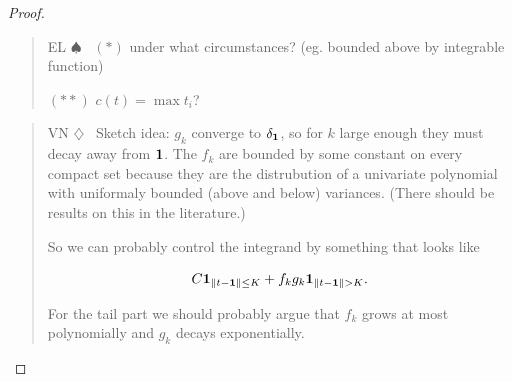 \documentclass[12pt]{article}
\newenvironment{vn}{\begin{quote}\color{myviolet} \small\sf VN $\diamondsuit$~}{\end{quote}}
\newenvironment{el}{\begin{quote}\color{amethyst} \small\sf EL $\spadesuit$~}{\end{quote}}
\begin{document}
\begin{proof}
\begin{el}
        $(*)$ under what circumstances? (eg. bounded above by integrable function)

        $(**)$ $c(t) = \max t_i$?
    
    \end{el}

    \begin{vn}
        Sketch idea: $g_k$ converge to $\delta_{\bf 1}$, so for $k$ large enough they must decay away from ${\bf 1}$. The $f_k$ are bounded by some constant on every compact set because they are the distrubution of a univariate polynomial with uniformaly bounded (above and below) variances. (There should be results on this in the literature.)

        So we can probably control the integrand by something that looks like

\[  C {\bf 1}_{\| t - {\bf 1}\| \leq K} + f_k g_k   {\bf 1}_{\| t - {\bf 1}\| > K}. \]

For the tail part we should probably argue that $f_k$ grows at most polynomially and $g_k$ decays exponentially. 
    \end{vn}

  
    
    
    





\end{proof}
\end{document}
